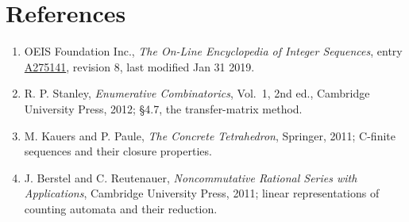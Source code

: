 \documentclass[11pt]{article}
\theoremstyle{definition}
\begin{document}
\section{References}

\begin{enumerate}

\item OEIS Foundation Inc., \emph{The On-Line Encyclopedia of Integer Sequences}, entry \href{https://oeis.org/A275141}{A275141}, revision 8, last modified Jan 31 2019.

\item R. P. Stanley, \emph{Enumerative Combinatorics}, Vol.~1, 2nd ed., Cambridge University Press, 2012; \S4.7, the transfer-matrix method.

\item M. Kauers and P. Paule, \emph{The Concrete Tetrahedron}, Springer, 2011; C-finite sequences and their closure properties.

\item J. Berstel and C. Reutenauer, \emph{Noncommutative Rational Series with Applications}, Cambridge University Press, 2011; linear representations of counting automata and their reduction.

\end{enumerate}
\end{document}
